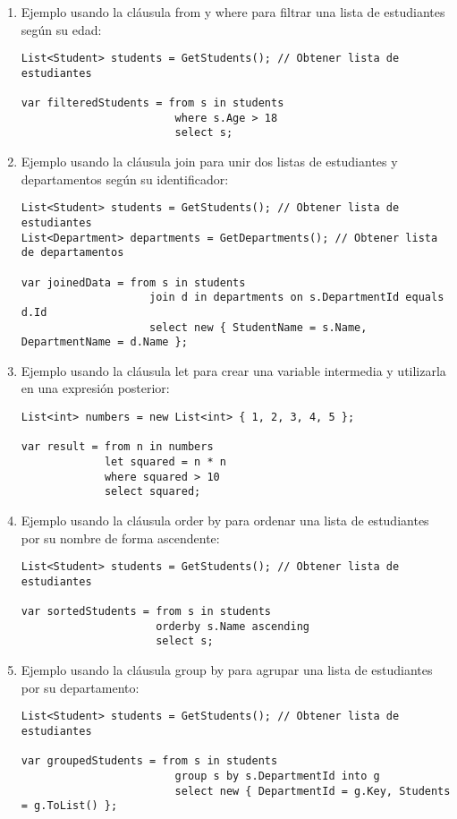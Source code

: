 \documentclass[executivepaper]{article}
\begin{document}
\begin{enumerate}
    \item Ejemplo usando la cláusula from y where para filtrar una lista de estudiantes según su edad:
\begin{lstlisting}
List<Student> students = GetStudents(); // Obtener lista de estudiantes

var filteredStudents = from s in students
                        where s.Age > 18
                        select s;    
\end{lstlisting}
    \item Ejemplo usando la cláusula join para unir dos listas de estudiantes y departamentos según su identificador:
\begin{lstlisting}
List<Student> students = GetStudents(); // Obtener lista de estudiantes
List<Department> departments = GetDepartments(); // Obtener lista de departamentos

var joinedData = from s in students
                    join d in departments on s.DepartmentId equals d.Id
                    select new { StudentName = s.Name, DepartmentName = d.Name };

\end{lstlisting}
    \item Ejemplo usando la cláusula let para crear una variable intermedia y utilizarla en una expresión posterior:
\begin{lstlisting}
List<int> numbers = new List<int> { 1, 2, 3, 4, 5 };

var result = from n in numbers
             let squared = n * n
             where squared > 10
             select squared;

\end{lstlisting}
    \item Ejemplo usando la cláusula order by para ordenar una lista de estudiantes por su nombre de forma ascendente:
\begin{lstlisting}
List<Student> students = GetStudents(); // Obtener lista de estudiantes

var sortedStudents = from s in students
                     orderby s.Name ascending
                     select s;

\end{lstlisting}
    \item Ejemplo usando la cláusula group by para agrupar una lista de estudiantes por su departamento:
\begin{lstlisting}
List<Student> students = GetStudents(); // Obtener lista de estudiantes

var groupedStudents = from s in students
                        group s by s.DepartmentId into g
                        select new { DepartmentId = g.Key, Students = g.ToList() };
\end{lstlisting}
\end{enumerate}
\end{document}
